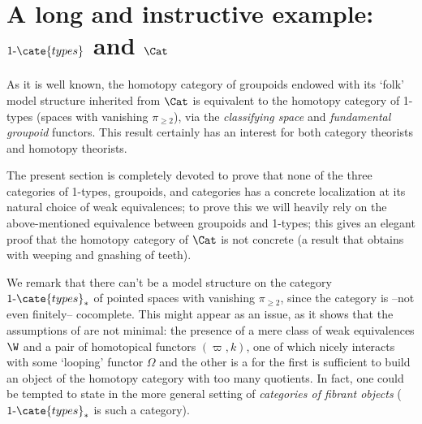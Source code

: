 \section{A long and instructive example: $1\text{-}\cate{types}$ and $\Cat$}
As it is well known, the homotopy category of groupoids endowed with its `folk' model structure inherited from $\Cat$ is equivalent to the homotopy category of 1-types (spaces with vanishing $\pi_{\ge 2}$), via the \emph{classifying space} and \emph{fundamental groupoid} functors. This result certainly has an interest for both category theorists and homotopy theorists.%

The present section is completely devoted to prove that none of the three categories of 1-types, groupoids, and categories has a concrete localization at its natural choice of weak equivalences; to prove this we will heavily rely on the above-mentioned equivalence between groupoids and 1-types; this gives an elegant proof that the homotopy category of $\Cat$ is not concrete (a result that \cite[§4.1]{fconc} obtains with weeping and gnashing of teeth).

We remark that there can't be a model structure on the category $1\text{-}\cate{types}_*$ of pointed spaces with vanishing $\pi_{\ge 2}$, since the category is --not even finitely-- cocomplete. This might appear as an issue, as it shows that the assumptions of \athm{} are not minimal: the presence of a mere class of weak equivalences $\W$ and a pair of homotopical functors $(\varpi,k)$, one of which nicely interacts with some `looping' functor $\Omega$ and the other is a \wco for the first is sufficient to build an object of the homotopy category with too many quotients. In fact, one could be tempted to state \athm{} in the more general setting of \emph{categories of fibrant objects} ($1\text{-}\cate{types}_*$ is such a category).%


